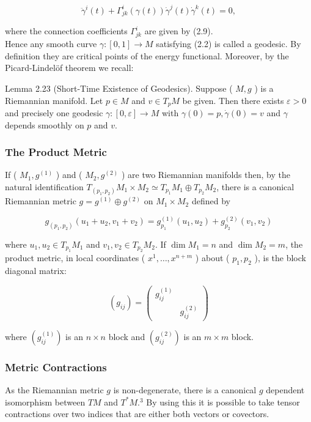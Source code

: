 \documentclass[10pt, letterpaper]{article}
\begin{document}
$$
\ddot{\gamma}^{i}(t)+\Gamma_{j k}^{i}(\gamma(t)) \dot{\gamma}^{j}(t) \dot{\gamma}^{k}(t)=0,
$$

where the connection coefficients $\Gamma_{j k}^{i}$ are given by (2.9).\\
Hence any smooth curve $\gamma:[0,1] \rightarrow M$ satisfying (2.2) is called a geodesic. By definition they are critical points of the energy functional. Moreover, by the Picard-Lindelöf theorem we recall:

Lemma 2.23 (Short-Time Existence of Geodesics). Suppose ( $M, g$ ) is a Riemannian manifold. Let $p \in M$ and $v \in T_{p} M$ be given. Then there exists $\varepsilon>0$ and precisely one geodesic $\gamma:[0, \varepsilon] \rightarrow M$ with $\gamma(0)=p, \dot{\gamma}(0)=v$ and $\gamma$ depends smoothly on $p$ and $v$.

\subsubsection*{The Product Metric}
If ( $M_{1}, g^{(1)}$ ) and ( $M_{2}, g^{(2)}$ ) are two Riemannian manifolds then, by the natural identification $T_{\left(p_{1}, p_{2}\right)} M_{1} \times M_{2} \simeq T_{p_{1}} M_{1} \oplus T_{p_{2}} M_{2}$, there is a canonical Riemannian metric $g=g^{(1)} \oplus g^{(2)}$ on $M_{1} \times M_{2}$ defined by

$$
g_{\left(p_{1}, p_{2}\right)}\left(u_{1}+u_{2}, v_{1}+v_{2}\right)=g_{p_{1}}^{(1)}\left(u_{1}, u_{2}\right)+g_{p_{2}}^{(2)}\left(v_{1}, v_{2}\right)
$$

where $u_{1}, u_{2} \in T_{p_{1}} M_{1}$ and $v_{1}, v_{2} \in T_{p_{2}} M_{2}$. If $\operatorname{dim} M_{1}=n$ and $\operatorname{dim} M_{2}=m$, the product metric, in local coordinates ( $x^{1}, \ldots, x^{n+m}$ ) about ( $p_{1}, p_{2}$ ), is the block diagonal matrix:

$$
\left(g_{i j}\right)=\left(\begin{array}{cc}
g_{i j}^{(1)} & \\
& g_{i j}^{(2)}
\end{array}\right)
$$

where $\left(g_{i j}^{(1)}\right)$ is an $n \times n$ block and $\left(g_{i j}^{(2)}\right)$ is an $m \times m$ block.

\subsubsection*{Metric Contractions}
As the Riemannian metric $g$ is non-degenerate, there is a canonical $g$ dependent isomorphism between $T M$ and $T^{*} M .^{3}$ By using this it is possible to take tensor contractions over two indices that are either both vectors or covectors.
\end{document}
